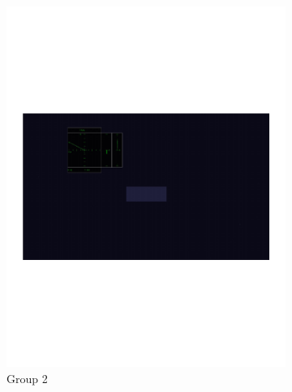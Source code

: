 \documentclass[]{aiaa-tc}%
\begin{document}
\begin{figure}[b!]
\begin{subfigure}{.5\textwidth}
    \includegraphics[width=.99\linewidth, page=2]{figs/guidance_full.pdf}
    \caption{Group 2}
    \label{fig:sub2}
  \end{subfigure}\vspace{1em}
  \begin{subfigure}{.5\textwidth}
    \centering

\end{subfigure}
\end{figure}
\end{document}
